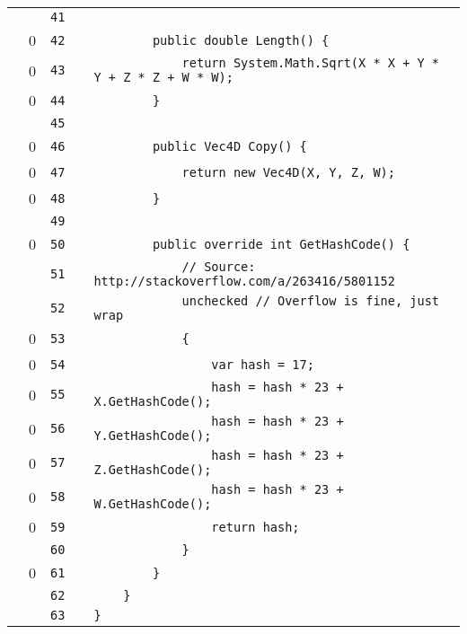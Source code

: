 \documentclass[a4paper,landscape,10pt]{article}
\begin{document}
\begin{longtable}[l]{lrrll}
\cellcolor{gray} &  & \verb~41~ & & \verb~~\\
\cellcolor{red} & 0 & \verb~42~ & & \verb~        public double Length() {~\\
\cellcolor{red} & 0 & \verb~43~ & & \verb~            return System.Math.Sqrt(X * X + Y * Y + Z * Z + W * W);~\\
\cellcolor{red} & 0 & \verb~44~ & & \verb~        }~\\
\cellcolor{gray} &  & \verb~45~ & & \verb~~\\
\cellcolor{red} & 0 & \verb~46~ & & \verb~        public Vec4D Copy() {~\\
\cellcolor{red} & 0 & \verb~47~ & & \verb~            return new Vec4D(X, Y, Z, W);~\\
\cellcolor{red} & 0 & \verb~48~ & & \verb~        }~\\
\cellcolor{gray} &  & \verb~49~ & & \verb~~\\
\cellcolor{red} & 0 & \verb~50~ & & \verb~        public override int GetHashCode() {~\\
\cellcolor{gray} &  & \verb~51~ & & \verb~            // Source: http://stackoverflow.com/a/263416/5801152~\\
\cellcolor{gray} &  & \verb~52~ & & \verb~            unchecked // Overflow is fine, just wrap~\\
\cellcolor{red} & 0 & \verb~53~ & & \verb~            {~\\
\cellcolor{red} & 0 & \verb~54~ & & \verb~                var hash = 17;~\\
\cellcolor{red} & 0 & \verb~55~ & & \verb~                hash = hash * 23 + X.GetHashCode();~\\
\cellcolor{red} & 0 & \verb~56~ & & \verb~                hash = hash * 23 + Y.GetHashCode();~\\
\cellcolor{red} & 0 & \verb~57~ & & \verb~                hash = hash * 23 + Z.GetHashCode();~\\
\cellcolor{red} & 0 & \verb~58~ & & \verb~                hash = hash * 23 + W.GetHashCode();~\\
\cellcolor{red} & 0 & \verb~59~ & & \verb~                return hash;~\\
\cellcolor{gray} &  & \verb~60~ & & \verb~            }~\\
\cellcolor{red} & 0 & \verb~61~ & & \verb~        }~\\
\cellcolor{gray} &  & \verb~62~ & & \verb~    }~\\
\cellcolor{gray} &  & \verb~63~ & & \verb~}~\\
\end{longtable}
\newpage
\end{document}
